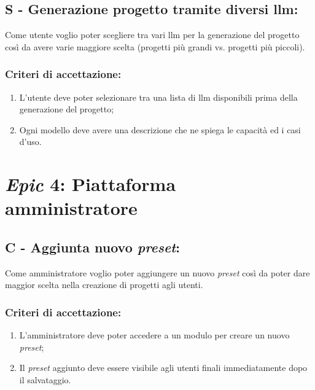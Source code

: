 \subsection*{S - Generazione progetto tramite diversi \gls{llm}:}

\noindent Come utente voglio poter scegliere tra vari \gls{llm} per la generazione del progetto così da avere varie maggiore scelta (progetti più grandi vs. progetti più piccoli). 

\subsubsection*{Criteri di accettazione:}

\begin{enumerate}
    \item L'utente deve poter selezionare tra una lista di \gls{llm} disponibili prima della generazione del progetto;
    \item Ogni modello deve avere una descrizione che ne spiega le capacità ed i casi d'uso.
\end{enumerate}

\vspace{0.5cm}

\section*{\textit{Epic} 4: Piattaforma amministratore}

\subsection*{C - Aggiunta nuovo \textit{preset}:}

\noindent Come amministratore voglio poter aggiungere un nuovo \textit{preset} così da poter dare maggior scelta nella creazione di progetti agli utenti.

\subsubsection*{Criteri di accettazione:}

\begin{enumerate}
    \item L'amministratore deve poter accedere a un modulo per creare un nuovo \textit{preset};
    \item Il \textit{preset} aggiunto deve essere visibile agli utenti finali immediatamente dopo il salvataggio.
\end{enumerate}

